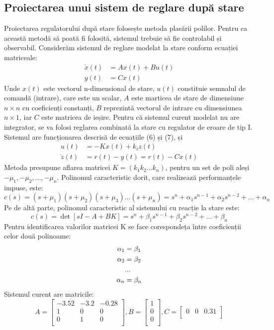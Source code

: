 \documentclass[11pt]{article}
\begin{document}
\subsection{Proiectarea unui sistem de reglare după stare}
Proiectarea regulatorului după stare folosește metoda plasării polilor. Pentru ca această metodă să poată fi
folosită, sistemul trebuie să fie controlabil și observabil.
Considerăm sistemul de reglare modelat la stare conform ecuației matriceale:\\
\begin{align}
\dot{x}(t)&=Ax(t)+Bu(t)\\
y(t)&=Cx(t)
\end{align}
Unde $x(t)$ este vectorul n-dimensional de stare, $u(t)$ constituie semnalul de comandă (intrare), care este un
scalar, $A$ este marticea de stare de dimensiune $n \times n$ cu coeficienți constanți, $B$ reprezintă vectorul de intrare
cu dimensiunea $n \times 1$, iar $C$ este matricea de ieșire.
Pentru că sistemul curent modelat nu are integrator, se va folosi reglarea combinată la stare cu regulator de
eroare de tip I.
Sistemul are funcționarea descrisă de ecuațiile (6) și (7), și
\begin{align}
u(t)&=-Kx(t)+k_{i}z(t)\\
\dot{z}(t)&=r(t)-y(t)=r(t)-Cx(t)
\end{align}
Metoda presupune aflarea matricei $K=(k_1 k_2 ... k_n)$, pentru un set de poli aleși
$-\mu_1, -\mu_2, ..., -\mu_n$. Polinomul caracteristic dorit, care realizează performanțele impuse, este:
\begin{equation}
c(s)=(s+\mu_1)(s+\mu_2)(s+\mu_3) ... (s+\mu_n)=s^n+\alpha_1s^{n-1}+\alpha_2s^{n-2}+...+\alpha_n
\end{equation}
Pe de altă parte, polinomul caracteristic al sistemului cu reacție la stare este:
\begin{equation}
c(s)=\det[sI-A+BK]=s^n+\beta_1s^{n-1}+\beta_2s^{n-2}+...+\beta_n
\end{equation}
Pentru identificarea valorilor matricei K se face corespondeța între coeficienții celor două polinoame:
\begin{align}
\alpha_1&=\beta_1\notag\\
\alpha_2&=\beta_2\notag\\
&...\notag\\
\alpha_n&=\beta_n\notag
\end{align}
Sistemul curent are matricile:
\[A=
\begin{bmatrix}
-3.52       & -3.2 & -0.28\\
1       & 0 & 0\\
0      & 1 & 0\\
\end{bmatrix},
B=
\begin{bmatrix}
1 \\ 
0 \\
0 \\
\end{bmatrix},
C=\begin{bmatrix}
0  &0&0.31      \\
\end{bmatrix}
\]
\end{document}
